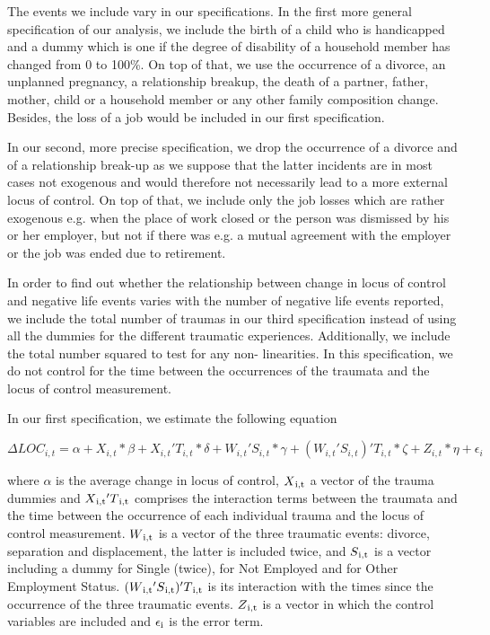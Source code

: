 \documentclass[12pt, a4paper, fleqn, parskip]{scrartcl}
\begin{document}
The events we include vary in our specifications. In the first more general
specification of our analysis, we include the birth of a child who is
handicapped and a dummy which is one if the degree of disability of a household
member has changed from 0 to 100\%. On top of that, we use the occurrence of a
divorce, an unplanned pregnancy, a relationship breakup, the death of a
partner, father, mother, child or a household member or any other family
composition change. Besides, the loss of a job would be included in our first
specification.

In our second, more precise specification, we drop the occurrence of a divorce
and of a relationship break-up as we suppose that the latter incidents are in
most cases not exogenous and would therefore not necessarily lead to a more
external locus of control. On top of that, we include only the job losses which
are rather exogenous e.g. when the place of work closed or the person was
dismissed by his or her employer, but not if there was e.g. a mutual agreement
with the employer or the job was ended due to retirement.

In order to find out whether the relationship between change in locus of
control and negative life events varies with the number of negative life events
reported, we include the total number of traumas in our third specification
instead of using all the dummies for the different traumatic experiences.
Additionally, we include the total number squared to test for any non-
linearities. In this specification, we do not control for the time between the
occurrences of the traumata and the locus of control measurement.

In our first specification, we estimate the following equation

\begin{center}
    $ \Delta LOC_{i,t}= \alpha + X_{i,t} * \beta  + X_{i,t} ' T_{i,t} * \delta + W_{i,t} ' S_{i,t} * \gamma + (W_{i,t}' S_{i,t}) ' T_{i,t} * \zeta + Z_{i,t} * \eta + \epsilon_{i}  $
\end{center}

where $\alpha$ is the average change in locus of control, $
X\textsubscript{i,t}$ a vector of the trauma dummies and $ X
\textsubscript{i,t} ' T \textsubscript{i,t}$ comprises the interaction terms
between the traumata and the time between the occurrence of each individual
trauma and the locus of control measurement. $ W \textsubscript{i,t}$ is a
vector of the three traumatic events: divorce, separation and displacement, the
latter is included twice, and $ S \textsubscript{i,t} $ is a vector including a
dummy for Single (twice), for Not Employed and for Other Employment Status. $(W
\textsubscript{i,t} ' S \textsubscript{i,t}) ' T \textsubscript{i,t} $ is its
interaction with the times since the occurrence of the three traumatic events.
$ Z \textsubscript{i,t}$ is a vector in which the control variables are
included and $\epsilon\textsubscript{i}$ is the error term.
\end{document}
